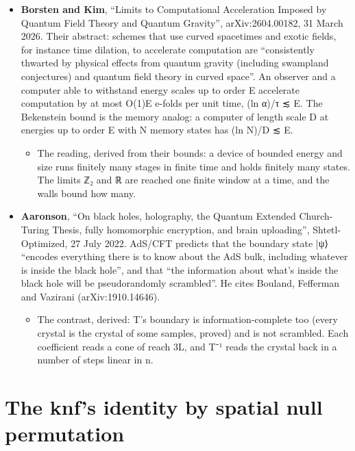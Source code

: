 \begin{itemize}
\item \textbf{Borsten and Kim}, “Limits to Computational Acceleration Imposed by Quantum Field Theory and Quantum Gravity”, arXiv:2604.00182, 31 March 2026. Their abstract: schemes that use curved spacetimes and exotic fields, for instance time dilation, to accelerate computation are “consistently thwarted by physical effects from quantum gravity (including swampland conjectures) and quantum field theory in curved space”. An observer and a computer able to withstand energy scales up to order E accelerate computation by at most O(1)E e-folds per unit time, (ln α)/τ ≲ E. The Bekenstein bound is the memory analog: a computer of length scale D at energies up to order E with N memory states has (ln N)/D ≲ E.

\begin{itemize}
\item The reading, derived from their bounds: a device of bounded energy and size runs finitely many stages in finite time and holds finitely many states. The limits ℤ₂ and ℝ are reached one finite window at a time, and the walls bound how many.
\end{itemize}
\item \textbf{Aaronson}, “On black holes, holography, the Quantum Extended Church-Turing Thesis, fully homomorphic encryption, and brain uploading”, Shtetl-Optimized, 27 July 2022. AdS/CFT predicts that the boundary state |ψ⟩ “encodes everything there is to know about the AdS bulk, including whatever is inside the black hole”, and that “the information about what's inside the black hole will be pseudorandomly scrambled”. He cites Bouland, Fefferman and Vazirani (arXiv:1910.14646).

\begin{itemize}
\item The contrast, derived: T's boundary is information-complete too (every crystal is the crystal of some samples, proved) and is not scrambled. Each coefficient reads a cone of reach 3L, and T⁻¹ reads the crystal back in a number of steps linear in n.
\end{itemize}
\end{itemize}

\section{\texorpdfstring{The knf's identity by spatial null permutation}{The knf's identity by spatial null permutation}}


